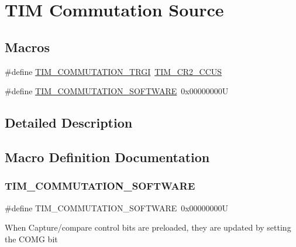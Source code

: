 \hypertarget{group___t_i_m___commutation___source}{}\section{T\+IM Commutation Source}
\label{group___t_i_m___commutation___source}
\subsection*{Macros}
\begin{DoxyCompactItemize}
\item 
\#define \mbox{\hyperlink{group___t_i_m___commutation___source_gab2e11763b5e061a5b3056ac970f57ab1}{T\+I\+M\+\_\+\+C\+O\+M\+M\+U\+T\+A\+T\+I\+O\+N\+\_\+\+T\+R\+GI}}~\mbox{\hyperlink{group___peripheral___registers___bits___definition_gaf0328c1339b2b1633ef7a8db4c02d0d5}{T\+I\+M\+\_\+\+C\+R2\+\_\+\+C\+C\+US}}
\item 
\#define \mbox{\hyperlink{group___t_i_m___commutation___source_ga9cd117a69cbca219c1cf29e74746a496}{T\+I\+M\+\_\+\+C\+O\+M\+M\+U\+T\+A\+T\+I\+O\+N\+\_\+\+S\+O\+F\+T\+W\+A\+RE}}~0x00000000U
\end{DoxyCompactItemize}


\subsection{Detailed Description}


\subsection{Macro Definition Documentation}
\mbox{\label{group___t_i_m___commutation___source_ga9cd117a69cbca219c1cf29e74746a496}} 
\subsubsection{\texorpdfstring{TIM\_COMMUTATION\_SOFTWARE}{TIM\_COMMUTATION\_SOFTWARE}}
{\footnotesize\ttfamily \#define T\+I\+M\+\_\+\+C\+O\+M\+M\+U\+T\+A\+T\+I\+O\+N\+\_\+\+S\+O\+F\+T\+W\+A\+RE~0x00000000U}

When Capture/compare control bits are preloaded, they are updated by setting the C\+O\+MG bit \mbox{\label{group___t_i_m___commutation___source_gab2e11763b5e061a5b3056ac970f57ab1}} 
